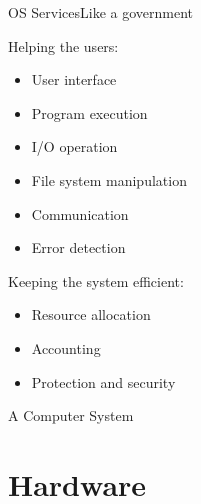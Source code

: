 \begin{frame}{OS Services}{Like a government}
  \begin{block}{Helping the users:}
    \begin{multicols}{2}
      \begin{itemize}
      \item User interface
      \item Program execution
      \item I/O operation
      \item File system manipulation
      \item Communication
      \item Error detection
      \end{itemize}
    \end{multicols}
  \end{block}
  \begin{block}{Keeping the system efficient:}
  \begin{itemize}
  \item Resource allocation
  \item Accounting
  \item Protection and security
  \end{itemize}
  \end{block}
\end{frame}

\begin{frame}{A Computer System}
  \begin{center}
  \end{center}
\end{frame}

\section{Hardware}
\label{sec:cpu}


